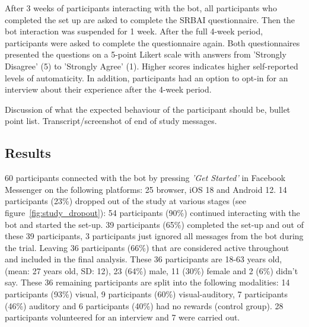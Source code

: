 After 3 weeks of participants interacting with the bot, all participants who completed the set up are asked to complete the SRBAI questionnaire. Then the bot interaction was suspended for 1 week. After the full 4-week period, participants were asked to complete the questionnaire again. Both questionnaires presented the questions on a 5-point Likert scale with answers from 'Strongly Disagree' (5) to 'Strongly Agree' (1). Higher scores indicates higher self-reported levels of automaticity. In addition, participants had an option to opt-in for an interview about their experience after the 4-week period.


Discussion of what the expected behaviour of the participant should be, bullet point list.\newline
Transcript/screenshot of end of study messages.\newline


\subsection{Results}
60 participants connected with the bot by pressing \textit{'Get Started'} in Facebook Messenger on the following platforms: 25 browser, iOS 18 and Android 12. 14 participants (23\%) dropped out of the study at various stages (see figure~\ref{fig:study_dropout}): 54 participants (90\%) continued interacting with the bot and started the set-up. 39 participants (65\%) completed the set-up and out of these 39 participants, 3 participants just ignored all messages from the bot during the trial. Leaving 36 participants (66\%) that are considered active throughout and included in the final analysis. These 36 participants are 18-63 years old, (mean: 27 years old, SD: 12), 23 (64\%) male, 11 (30\%) female and 2 (6\%) didn't say. These 36 remaining participants are split into the following modalities: 14 participants (93\%) visual, 9 participants (60\%) visual-auditory, 7 participants (46\%) auditory and 6 participants (40\%) had no rewards (control group). 28 participants volunteered for an interview and 7 were carried out.

